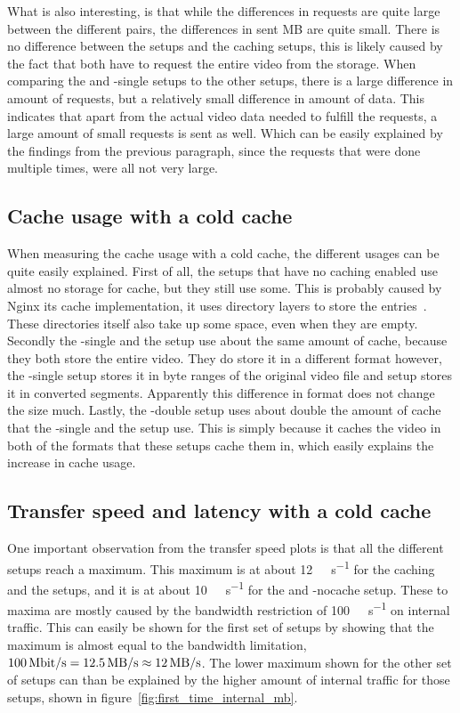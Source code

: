 \documentclass[twoside,openright]{uva-bachelor-thesis}
\newcommand{\mbps}[1]{\SI[per-mode=symbol]{#1}{\mega\bit\per\second}}
\newcommand{\Mbps}[1]{\SI[per-mode=symbol]{#1}{\mega\byte\per\second}}
\begin{document}
What is also interesting, is that while the differences in requests are quite
large between the different pairs, the differences in sent MB are quite small.
There is no difference between the \cdn setups and the caching \lt setups, this
is likely caused by the fact that both have to request the entire video from the
storage. When comparing the \ipp and \lt-single setups to the other setups,
there is a large difference in amount of requests, but a relatively small
difference in amount of data. This indicates that apart from the actual video
data needed to fulfill the requests, a large amount of small requests is sent
as well.  Which can be easily explained by the findings from the previous
paragraph, since the requests that were done multiple times, were all not very
large.

\subsection{Cache usage with a cold cache}
When measuring the cache usage with a cold cache, the different usages can be
quite easily explained. First of all, the setups that have no caching enabled
use almost no storage for cache, but they still use some. This is probably
caused by Nginx its cache implementation, it uses directory layers to store the
entries~\autocite{nginxcachelevels}. These directories itself also take up some
space, even when they are empty. Secondly the \lt-single and the \cdn setup use
about the same amount of cache, because they both store the entire video. They
do store it in a different format however, the \lt-single setup stores it in
byte ranges of the original video file and \cdn setup stores it in converted segments.
Apparently this difference in format does not change the size much. Lastly, the
\lt-double setup uses about double the amount of cache that the \lt-single and
the \cdn setup use. This is simply because it caches the video in both of the
formats that these setups cache them in, which easily explains the increase in
cache usage.

\subsection{Transfer speed and latency with a cold cache}
One important observation from the transfer speed plots is that all the
different setups reach a maximum. This maximum is at about \Mbps{12} for the
caching \lt and the \cdn setups, and it is at about \Mbps{10} for the
\ipp and \lt-nocache setup. These to maxima are mostly caused by the bandwidth
restriction of \mbps{100} on internal traffic. This can easily be shown for the
first set of setups by showing that the maximum is almost equal to the bandwidth
limitation, $\mbps{100} = \Mbps{12.5} \approx
\Mbps{12}$. The lower maximum shown for the other set of setups can than be
explained by the higher amount of internal traffic for those setups, shown in
figure~\ref{fig:first_time_internal_mb}.
\end{document}
